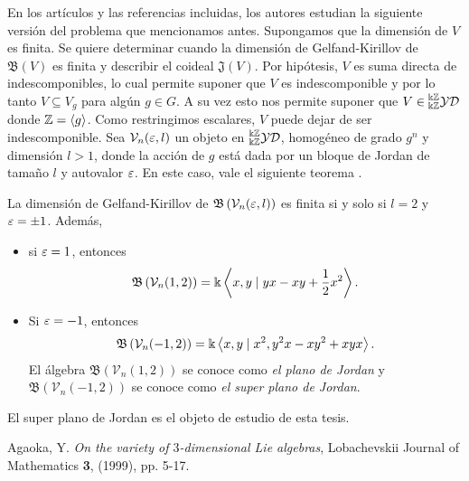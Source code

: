 \documentclass[a4paper,oneside,fleqn,11pt,../tesis.tex]{subfiles}
\begin{document}
En los artículos  y las referencias incluidas, los autores estudian la siguiente versión del problema que mencionamos antes. Supongamos que la dimensión de $V$ es finita. Se quiere determinar cuando
la dimensión de Gelfand-Kirillov de $\mathfrak{B}(V)$ es finita y describir el coideal $\mathfrak{J}(V)$.
Por hipótesis, $V$ es suma directa de indescomponibles, lo cual permite suponer
que $V$ es indescomponible y por lo tanto $V \subseteq V_g$ para algún $g \in G$. A su vez esto nos permite suponer
que $V \in \prescript{\Bbbk\mathbb{Z}}{\Bbbk\mathbb{Z}}{\mathcal{YD}}$ donde $\mathbb{Z} = \left\langle g \right\rangle$. Como restringimos escalares, $V$ puede dejar de ser indescomponible. Sea $\mathcal{V}_n(\varepsilon, l)$ un objeto en $\prescript{\Bbbk\mathbb{Z}}{\Bbbk\mathbb{Z}}{\mathcal{YD}}$, homogéneo de grado $g^n$ y dimensión $l > 1$, 
donde la acción de $g$ está dada por un bloque de Jordan de tamaño $l$ y autovalor $\varepsilon$.
En este caso, vale el siguiente teorema .

\begin{Teorema}
La dimensión de Gelfand-Kirillov de $\mathfrak{B}\left(\mathcal{V}_n(\varepsilon, l)\right)$ es finita si y solo si $l = 2$ y $\varepsilon = \pm 1$.
Además,
\begin{itemize}
	\item si $\varepsilon = 1$, entonces
	\[
		\mathfrak{B}\left(\mathcal{V}_n(1, 2)\right) = \Bbbk\left\langle x, y \mid yx - xy + \frac{1}{2}x^2 \right\rangle.
	\]
	\item Si $\varepsilon = -1$, entonces
	\[
		\mathfrak{B}\left(\mathcal{V}_n(-1, 2)\right) = \Bbbk\left\langle x, y \mid x^2, y^2x - xy^2 + xyx \right\rangle.
	\]
	El álgebra $\mathfrak{B}\left(\mathcal{V}_n(1, 2)\right)$ se conoce como \emph{el plano de Jordan}
	y $\mathfrak{B}\left(\mathcal{V}_n(-1, 2)\right)$ se conoce como \emph{el super plano de Jordan}.
\end{itemize}
\end{Teorema}
El super plano de Jordan es el objeto de estudio de esta tesis.

\begin{thebibliography}{99}

 Agaoka, Y. \textit{On the variety of $3$-dimensional Lie algebras}, Lobachevskii Journal of
Mathematics {\bf 3}, (1999), pp. 5-17.

\end{thebibliography}
\end{document}
